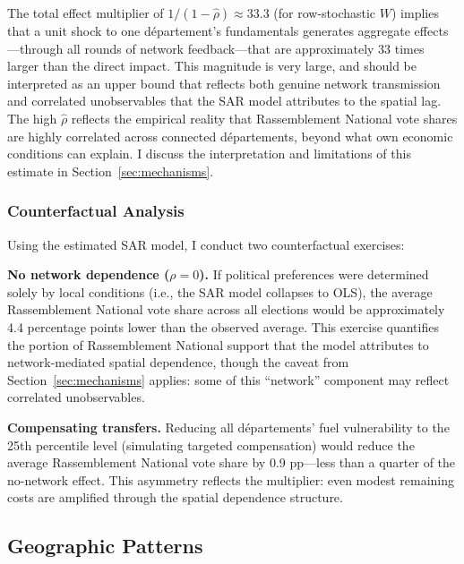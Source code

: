 \documentclass[12pt]{article}
\newcommand{\rn}{Rassemblement National}
\newcommand{\dept}{d\'{e}partement}
\newcommand{\depts}{d\'{e}partements}
\begin{document}
The total effect multiplier of $1/(1-\hat{\rho}) \approx 33.3$ (for row-stochastic $W$) implies that a unit shock to one \dept{}'s fundamentals generates aggregate effects---through all rounds of network feedback---that are approximately 33 times larger than the direct impact. This magnitude is very large, and should be interpreted as an upper bound that reflects both genuine network transmission and correlated unobservables that the SAR model attributes to the spatial lag. The high $\hat{\rho}$ reflects the empirical reality that \rn{} vote shares are highly correlated across connected \depts{}, beyond what own economic conditions can explain. I discuss the interpretation and limitations of this estimate in Section~\ref{sec:mechanisms}.

\subsubsection{Counterfactual Analysis}

Using the estimated SAR model, I conduct two counterfactual exercises:

\textbf{No network dependence ($\rho = 0$).} If political preferences were determined solely by local conditions (i.e., the SAR model collapses to OLS), the average \rn{} vote share across all elections would be approximately 4.4 percentage points lower than the observed average. This exercise quantifies the portion of \rn{} support that the model attributes to network-mediated spatial dependence, though the caveat from Section~\ref{sec:mechanisms} applies: some of this ``network'' component may reflect correlated unobservables.

\textbf{Compensating transfers.} Reducing all \depts{}' fuel vulnerability to the 25th percentile level (simulating targeted compensation) would reduce the average \rn{} vote share by 0.9 pp---less than a quarter of the no-network effect. This asymmetry reflects the multiplier: even modest remaining costs are amplified through the spatial dependence structure.

\subsection{Geographic Patterns}
\end{document}
